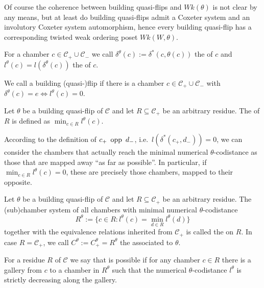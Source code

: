Of course the coherence between building quasi-flips and $Wk(\theta)$ is not clear by any means, but at least do building quasi-flips admit a Coxeter system and an involutory Coxeter system automorphism, hence every building quasi-flip has a corresponding twisted weak ordering poset $Wk(W,\theta)$.

\begin{defi}
	For a chamber $c \in \mathcal C_+ \cup \mathcal C_-$ we call $\delta^\theta(c) := \delta^*(c,\theta(c))$ the  of $c$ and $l^\theta(c) = l(\delta^\theta(c))$ the  of $c$.
\end{defi}

\begin{defi}
	We call a building (quasi-)flip  if there is a chamber $c \in \mathcal{C}_+ \cup \mathcal{C}_-$ with $\delta^{\theta}(c) = e \iff l^{\theta}(c) = 0$.
\end{defi}

\begin{defi}
	Let $\theta$ be a building quasi-flip of $\mathcal C$ and let $R \subseteq \mathcal C_+$ be an arbitrary residue. The  of $R$ is defined as $\min_{c \in R} l^{\theta}(c)$.
\end{defi}

According to the definition of $c_+ \opp d_-$, i.e.\ $l(\delta^*(c_+,d_-)) = 0$, we can consider the chambers that actually reach the minimal numerical $\theta$-codistance as those that are mapped away ``as far as possible''. In particular, if $\min_{c \in R} l^{\theta}(c) = 0$, these are precisely those chambers, mapped to their opposite.

\begin{defi}
	Let $\theta$ be a building quasi-flip of $\mathcal C$ and let $R \subseteq \mathcal C_+$ be an arbitrary residue. The (sub)chamber system of all chambers with minimal numerical $\theta$-codistance
	$$ R^\theta := \{ c \in R : l^\theta(c) = \min_{d \in R} l^\theta(d) \} $$
	together with the equivalence relations inherited from $\mathcal C_+$ is called the  on $R$. In case $R = \mathcal C_+$, we call $C^\theta := C_+^\theta = R^\theta$ the  associated to $\theta$.
\end{defi}

\begin{defi}
	For a residue $R$ of $\mathcal{C}$ we say that  is possible if for any chamber $c \in R$ there is a gallery from $c$ to a chamber in $R^\theta$ such that the numerical $\theta$-codistance $l^\theta$ is strictly decreasing along the gallery.
\end{defi}

